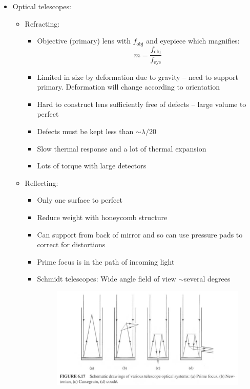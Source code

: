 \documentclass[12pt]{article}
\begin{document}
\begin{itemize}
\item Optical telescopes:
\begin{itemize}
\item Refracting:
\begin{itemize}
\item Objective (primary) lens with $f_\text{obj}$ and eyepiece which magnifies:
\begin{equation}
m = \frac{f_\text{obj}}{f_\text{eye}}
\end{equation}
\item Limited in size by deformation due to gravity -- need to support primary. Deformation will change according to orientation
\item Hard to construct lens sufficiently free of defects -- large volume to perfect
\item Defects must be kept less than $\sim\lambda/20$
\item Slow thermal response and a lot of thermal expansion
\item Lots of torque with large detectors
\end{itemize}
\item Reflecting:
\begin{itemize}
\item Only one surface to perfect
\item Reduce weight with honeycomb  structure
\item Can support from back of mirror and so can use pressure pads to correct for distortions
\item Prime focus is in the path of incoming light
\item Schmidt telescopes: Wide angle field of view $\sim$several degrees
\begin{figure}[h!]
\centering
\includegraphics[width=6in]{CandOfigs/telescopetypes.png}
\end{figure}
\end{itemize}

\end{itemize}
\end{itemize}
\end{document}
